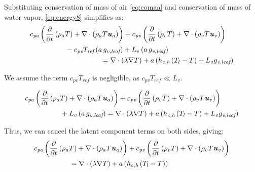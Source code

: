 Substituting conservation of mass of air \cref{eq:comaa} and conservation of mass of water vapor, \cref{eq:energy8} simplifies as:
\begin{equation}
\begin{split}
&c_{\textit{pa}}   \left( \frac{\partial }{\partial t} \left( \rho_a T \right) + \nabla\cdot \left(\rho_a T \mvec{u}_a \right)  \right) + c_{\textit{pv}} \left( \frac{\partial }{\partial t} \left( \rho_v T \right) + \nabla \cdot\left(\rho_v T \mvec{u}_v \right)  \right) \\ 
& \hspace{5em}- c_{\textit{pv}} T_{\textit{ref}} \left(a\,g_{\textit{v,leaf}}  \right) + L_v \left(a\,g_{\textit{v,leaf}}  \right) \\
& \hspace{10em} =  \nabla  \cdot \left(\lambda \nabla T \right) + a \left( h_{\textit{c,h}} \left(T_l - T\right) + L_v g_{\textit{v,leaf}} \right)
\end{split}
\label{eq:energy9}
\end{equation}

\begin{assumption}
We assume the term $c_{\textit{pv}} T_{\textit{ref}}$ is negligible, as  $c_{\textit{pv}} T_{\textit{ref}} \ll L_v$. 

\end{assumption}
\begin{equation}
\begin{split}
&c_{\textit{pa}}   \left( \frac{\partial }{\partial t} \left( \rho_a T \right) + \nabla \cdot \left(\rho_a T \textbf{\textit{u}}_a \right)  \right) + c_{\textit{pv}} \left( \frac{\partial }{\partial t} \left( \rho_v T \right) + \nabla \cdot \left(\rho_v T \textbf{\textit{u}}_v \right)  \right) \\ 
&\hspace{5em}+ L_v \left(a\,g_{\textit{v,leaf}}  \right) = \nabla  \cdot \left(\lambda \nabla T \right) + a \left( h_{\textit{c,h}} \left(T_l - T\right) + L_v g_{\textit{v,leaf}} \right)
\end{split}
\label{eq:energy10}
\end{equation}

Thus, we can cancel the latent component terms on both sides, giving:
\begin{equation}
\begin{split}
&c_{\textit{pa}}   \left( \frac{\partial }{\partial t} \left( \rho_a T \right) + \nabla \cdot \left(\rho_a T \textbf{\textit{u}}_a \right)  \right) + c_{\textit{pv}} \left( \frac{\partial }{\partial t} \left( \rho_v T \right) + \nabla \cdot \left(\rho_v T \textbf{\textit{u}}_v \right)  \right) \\ 
&\hspace{5em} = \nabla  \cdot \left(\lambda \nabla T \right) + a \left( h_{\textit{c,h}} \left(T_l - T\right) \right)
\end{split}
\label{eq:energy11}
\end{equation}

